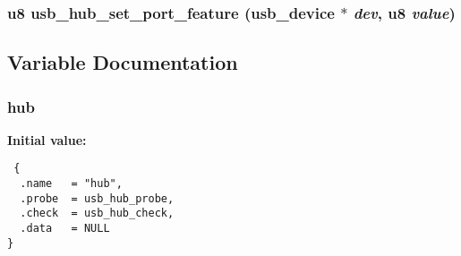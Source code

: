 \subsubsection{\setlength{\rightskip}{0pt plus 5cm}u8 usb\_\-hub\_\-set\_\-port\_\-feature ({\bf usb\_\-device} $\ast$ {\em dev}, u8 {\em value})}\label{hub_8c_332942f9b9b11780522158cd2f17ed58}




\subsection{Variable Documentation}
\subsubsection{ {\bf hub}}\label{hub_8c_8d2b9bec190364a4e93ecd03b4998a12}


\textbf{Initial value:}

\begin{Code}\begin{verbatim} {
  .name   = "hub",
  .probe  = usb_hub_probe,
  .check  = usb_hub_check,
  .data   = NULL
}
\end{verbatim}\end{Code}
